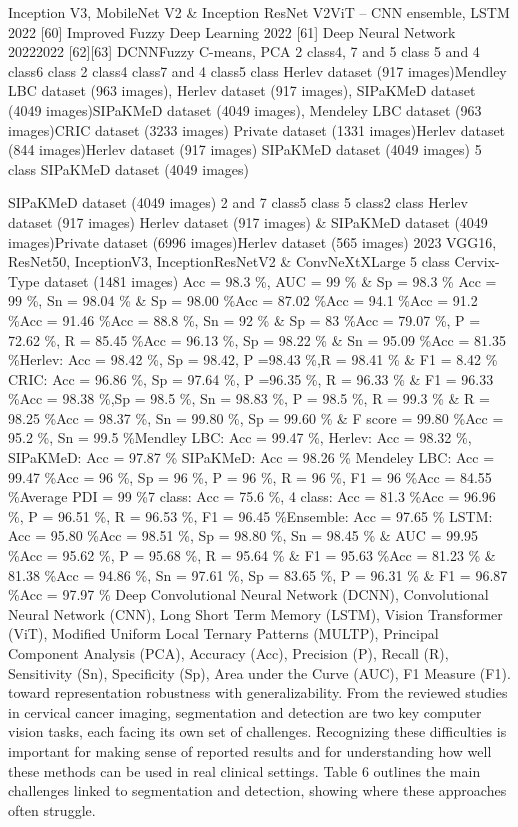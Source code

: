 \documentclass{svjour3}
\begin{document}
Inception V3, MobileNet V2 \& Inception ResNet V2ViT – CNN ensemble, LSTM
2022
[60]
Improved Fuzzy Deep Learning
2022
[61]
Deep Neural Network
20222022
[62][63]
DCNNFuzzy C-means, PCA
2 class4, 7 and 5 class
5 and 4 class6 class
2 class4 class7 and 4 class5 class
Herlev dataset (917 images)Mendley LBC dataset (963 images), Herlev dataset (917 images), SIPaKMeD dataset (4049 images)SIPaKMeD dataset (4049 images), Mendeley LBC dataset (963 images)CRIC dataset (3233 images)
Private dataset (1331 images)Herlev dataset (844 images)Herlev dataset (917 images)
SIPaKMeD dataset (4049 images)
5 class
SIPaKMeD dataset (4049 images)

SIPaKMeD dataset (4049 images)
2 and 7 class5 class
5 class2 class
Herlev dataset (917 images)
Herlev dataset (917 images) \& SIPaKMeD dataset (4049 images)Private dataset (6996 images)Herlev dataset (565 images)
2023
\cite{ref64}
VGG16, ResNet50, InceptionV3, InceptionResNetV2 \& ConvNeXtXLarge
5 class
Cervix-Type dataset (1481 images)
Acc = 98.3 \%, AUC = 99 \% \& Sp = 98.3 \%
Acc = 99 \%, Sn = 98.04 \% \& Sp = 98.00 \%Acc = 87.02 \%Acc = 94.1 \%Acc = 91.2 \%Acc = 91.46 \%Acc = 88.8 \%, Sn = 92 \% \& Sp = 83 \%Acc = 79.07 \%, P = 72.62 \%, R = 85.45 \%Acc = 96.13 \%, Sp = 98.22 \% \& Sn = 95.09 \%Acc = 81.35 \%Herlev: Acc = 98.42 \%, Sp = 98.42, P =98.43 \%,R = 98.41 \% \& F1 = 8.42 \% CRIC: Acc = 96.86 \%, Sp = 97.64 \%, P =96.35 \%, R = 96.33 \% \& F1 = 96.33 \%Acc = 98.38 \%,Sp = 98.5 \%, Sn = 98.83 \%, P = 98.5 \%, R = 99.3 \% \& R = 98.25 \%Acc = 98.37 \%, Sn = 99.80 \%, Sp = 99.60 \% \& F score = 99.80 \%Acc = 95.2 \%, Sn = 99.5 \%Mendley LBC: Acc = 99.47 \%, Herlev: Acc = 98.32 \%, SIPaKMeD: Acc = 97.87 \%
SIPaKMeD: Acc = 98.26 \% Mendeley LBC: Acc = 99.47 \%Acc = 96 \%, Sp = 96 \%, P = 96 \%, R = 96 \%, F1 = 96 \%Acc = 84.55 \%Average PDI = 99 \%7 class: Acc = 75.6 \%, 4 class: Acc = 81.3 \%Acc = 96.96 \%, P = 96.51 \%, R = 96.53 \%, F1 = 96.45 \%Ensemble: Acc = 97.65 \% LSTM: Acc = 95.80 \%Acc = 98.51 \%, Sp = 98.80 \%, Sn = 98.45 \% \& AUC = 99.95 \%Acc = 95.62 \%, P = 95.68 \%, R = 95.64 \% \& F1 = 95.63 \%Acc = 81.23 \% \& 81.38 \%Acc = 94.86 \%, Sn = 97.61 \%, Sp = 83.65 \%, P = 96.31 \% \& F1 = 96.87 \%Acc = 97.97 \%
Deep Convolutional Neural Network (DCNN), Convolutional Neural Network (CNN), Long Short Term Memory (LSTM), Vision Transformer (ViT), Modified Uniform Local Ternary Patterns (MULTP), Principal Component Analysis (PCA), Accuracy (Acc), Precision (P), Recall (R), Sensitivity (Sn), Specificity (Sp), Area under the Curve (AUC), F1 Measure (F1).
toward representation robustness with generalizability.
From the reviewed studies in cervical cancer imaging, segmentation and detection are two key computer vision tasks, each facing its own set of challenges. Recognizing these difficulties is important for making sense of reported results and for understanding how well these methods can be used in real clinical settings. Table 6 outlines the main challenges linked to segmentation and detection, showing where these approaches often struggle.
\end{document}
